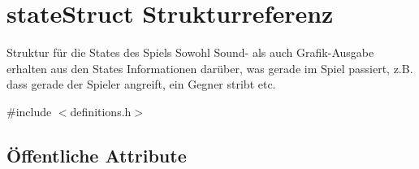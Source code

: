 \hypertarget{structstateStruct}{\section{state\-Struct Strukturreferenz}
\label{structstateStruct}
}


Struktur für die States des Spiels Sowohl Sound-\/ als auch Grafik-\/\-Ausgabe erhalten aus den States Informationen darüber, was gerade im Spiel passiert, z.\-B. dass gerade der Spieler angreift, ein Gegner stribt etc.  




{\ttfamily \#include $<$definitions.\-h$>$}

\subsection*{Öffentliche Attribute}
